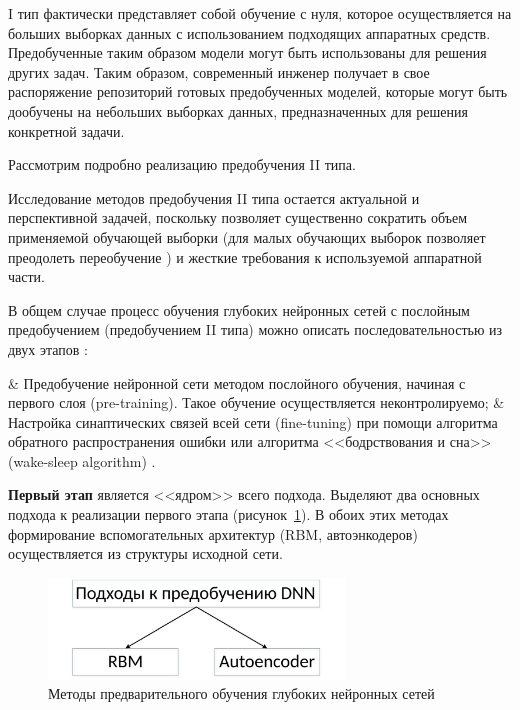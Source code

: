I тип фактически представляет собой обучение с нуля, которое осуществляется на больших выборках данных с использованием подходящих аппаратных средств. Предобученные таким образом модели могут быть использованы для решения других задач. Таким образом, современный инженер получает в свое распоряжение репозиторий готовых предобученных моделей, которые могут быть дообучены на небольших выборках данных, предназначенных для решения конкретной задачи.

Рассмотрим подробно реализацию предобучения II типа.

Исследование методов предобучения II типа остается актуальной и перспективной задачей, поскольку позволяет существенно сократить объем применяемой обучающей выборки (для малых обучающих выборок позволяет преодолеть переобучение \cite{LeCun2015}) и жесткие требования к используемой аппаратной части.

В общем случае процесс обучения глубоких нейронных сетей с послойным предобучением (предобучением II типа) можно описать последовательностью из двух этапов \cite{n1, n2, n3, n4}: 
\begin{easylistNum}
	& Предобучение нейронной сети методом послойного обучения, начиная с первого слоя  (pre-training). Такое обучение осуществляется неконтролируемо;
	& Настройка синаптических связей всей сети (fine-tuning) при помощи алгоритма обратного распространения ошибки или алгоритма <<бодрствования и сна>> (wake-sleep algorithm) \cite{hinton1995}.
\end{easylistNum}


\textbf{Первый этап} является <<ядром>> всего подхода.
Выделяют два основных подхода к реализации первого этапа (рисунок~\ref{fig:pic1_2}). %
В обоих этих методах формирование вспомогательных архитектур (RBM, автоэнкодеров) осуществляется из структуры исходной сети. 

\begin{figure}[H]
  \centering
  \includegraphics[width=0.7\textwidth]{man-source/images/ch1/pic1-2.pdf}
  \caption{Методы предварительного обучения глубоких нейронных сетей}
  \label{fig:pic1_2}
\end{figure}

